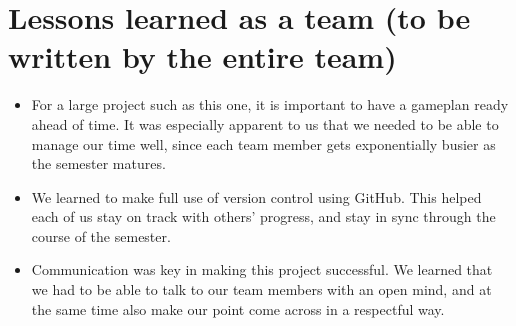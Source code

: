 
\section{Lessons learned as a team (to be written by the entire team)}
\begin{itemize}
\item For a large project such as this one, it is important to have a gameplan ready ahead of time. It was especially apparent to us that we needed to be able to manage our time well, since each team member gets exponentially busier as the semester matures. 
\item We learned to make full use of version control using GitHub. This helped each of us stay on track with others' progress, and stay in sync through the course of the semester.
\item Communication was key in making this project successful. We learned that we had to be able to talk to our team members with an open mind, and at the same time also make our point come across in a respectful way.
\end{itemize}



